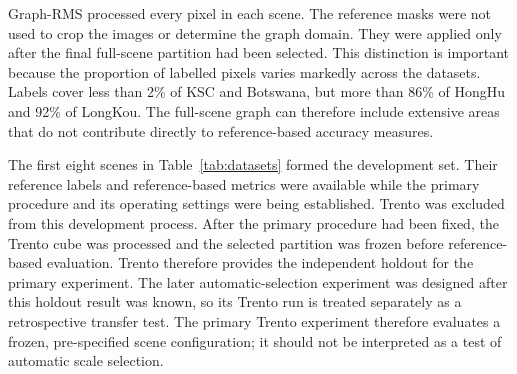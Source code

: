 \documentclass[10pt,a4paper,fleqn]{article}
\begin{document}
Graph-RMS processed every pixel in each scene. The reference masks were not
used to crop the images or determine the graph domain. They were applied only
after the final full-scene partition had been selected. This distinction is
important because the proportion of labelled pixels varies markedly across the
datasets. Labels cover less than 2\% of KSC and Botswana, but more than 86\% of
HongHu and 92\% of LongKou. The full-scene graph can therefore include extensive
areas that do not contribute directly to reference-based accuracy measures.

The first eight scenes in Table~\ref{tab:datasets} formed the development set.
Their reference labels and reference-based metrics were available while the
primary procedure and its operating settings were being established. Trento
was excluded from this development process. After the primary procedure had
been fixed, the Trento cube was processed and the selected partition was
frozen before reference-based evaluation. Trento therefore provides the
independent holdout for the primary experiment. The later automatic-selection
experiment was designed after this holdout result was known, so its Trento
run is treated separately as a retrospective transfer test. The primary
Trento experiment therefore evaluates a frozen, pre-specified scene
configuration; it should not be interpreted as a test of automatic scale
selection.
\end{document}
